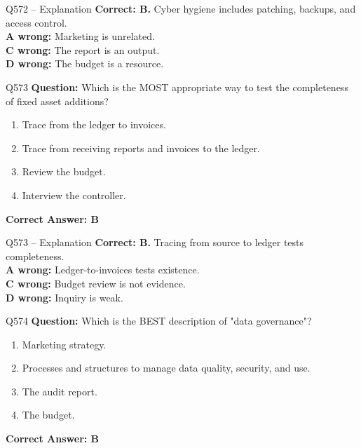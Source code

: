\documentclass[aspectratio=169,10pt]{beamer}
\begin{document}
	\begin{frame}[t]{Q572 -- Explanation}
		\small
		\textbf{Correct: B.} Cyber hygiene includes patching, backups, and access control. \\[4pt]
		\textbf{A wrong:} Marketing is unrelated. \\[2pt]
		\textbf{C wrong:} The report is an output. \\[2pt]
		\textbf{D wrong:} The budget is a resource.
	\end{frame}
	
	\begin{frame}[t]{Q573}
		\small
		\textbf{Question:} Which is the MOST appropriate way to test the completeness of fixed asset additions?
		\begin{enumerate}[label=\Alph*.,itemsep=1pt,topsep=2pt]
			\item Trace from the ledger to invoices.
			\item Trace from receiving reports and invoices to the ledger.
			\item Review the budget.
			\item Interview the controller.
		\end{enumerate}
		\vspace{4pt}
		\textbf{Correct Answer: B}
	\end{frame}
	
	\begin{frame}[t]{Q573 -- Explanation}
		\small
		\textbf{Correct: B.} Tracing from source to ledger tests completeness. \\[4pt]
		\textbf{A wrong:} Ledger-to-invoices tests existence. \\[2pt]
		\textbf{C wrong:} Budget review is not evidence. \\[2pt]
		\textbf{D wrong:} Inquiry is weak.
	\end{frame}
	
	\begin{frame}[t]{Q574}
		\small
		\textbf{Question:} Which is the BEST description of "data governance"?
		\begin{enumerate}[label=\Alph*.,itemsep=1pt,topsep=2pt]
			\item Marketing strategy.
			\item Processes and structures to manage data quality, security, and use.
			\item The audit report.
			\item The budget.
		\end{enumerate}
		\vspace{4pt}
		\textbf{Correct Answer: B}
	\end{frame}
	
\end{document}
